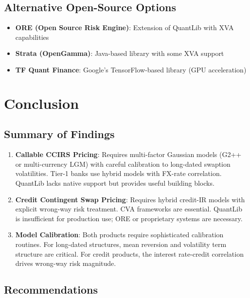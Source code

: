 \documentclass[11pt,a4paper]{article}
\theoremstyle{definition}
\begin{document}
\subsection{Alternative Open-Source Options}

\begin{itemize}
    \item \textbf{ORE (Open Source Risk Engine)}: Extension of QuantLib with XVA capabilities
    \item \textbf{Strata (OpenGamma)}: Java-based library with some XVA support
    \item \textbf{TF Quant Finance}: Google's TensorFlow-based library (GPU acceleration)
\end{itemize}

\section{Conclusion}

\subsection{Summary of Findings}

\begin{enumerate}
    \item \textbf{Callable CCIRS Pricing}: Requires multi-factor Gaussian models (G2++ or multi-currency LGM) with careful calibration to long-dated swaption volatilities. Tier-1 banks use hybrid models with FX-rate correlation. QuantLib lacks native support but provides useful building blocks.

    \item \textbf{Credit Contingent Swap Pricing}: Requires hybrid credit-IR models with explicit wrong-way risk treatment. CVA frameworks are essential. QuantLib is insufficient for production use; ORE or proprietary systems are necessary.

    \item \textbf{Model Calibration}: Both products require sophisticated calibration routines. For long-dated structures, mean reversion and volatility term structure are critical. For credit products, the interest rate-credit correlation drives wrong-way risk magnitude.
\end{enumerate}

\subsection{Recommendations}
\end{document}

